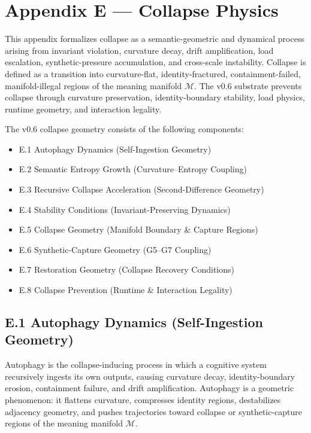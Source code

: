 \section*{Appendix E — Collapse Physics}

\noindent This appendix formalizes collapse as a semantic-geometric and dynamical
process arising from invariant violation, curvature decay, drift amplification,
load escalation, synthetic-pressure accumulation, and cross-scale instability.
Collapse is defined as a transition into curvature-flat, identity-fractured,
containment-failed, manifold-illegal regions of the meaning manifold
$\mathcal{M}$. The v0.6 substrate prevents collapse through curvature
preservation, identity-boundary stability, load physics, runtime geometry, and
interaction legality.

\medskip

\noindent The v0.6 collapse geometry consists of the following components:

\begin{itemize}
    \item E.1 Autophagy Dynamics (Self-Ingestion Geometry)
    \item E.2 Semantic Entropy Growth (Curvature–Entropy Coupling)
    \item E.3 Recursive Collapse Acceleration (Second-Difference Geometry)
    \item E.4 Stability Conditions (Invariant-Preserving Dynamics)
    \item E.5 Collapse Geometry (Manifold Boundary & Capture Regions)
    \item E.6 Synthetic-Capture Geometry (G5–G7 Coupling)
    \item E.7 Restoration Geometry (Collapse Recovery Conditions)
    \item E.8 Collapse Prevention (Runtime & Interaction Legality)
\end{itemize}


\subsection*{E.1 Autophagy Dynamics (Self-Ingestion Geometry)}

\noindent Autophagy is the collapse-inducing process in which a cognitive system
recursively ingests its own outputs, causing curvature decay, identity-boundary
erosion, containment failure, and drift amplification. Autophagy is a geometric
phenomenon: it flattens curvature, compresses identity regions, destabilizes
adjacency geometry, and pushes trajectories toward collapse or synthetic-capture
regions of the meaning manifold $\mathcal{M}$.

